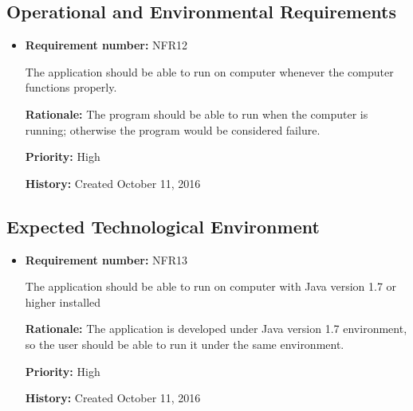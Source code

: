 \documentclass[12pt,letterpaper]{article}
\begin{document}
\subsection{Operational and Environmental Requirements}

\begin{reqbox}
	\begin{itemize}
\subsubsection{Expected Physical Environment}
	\item \textbf{Requirement number: }NFR12

	The application should be able to run on computer whenever the computer functions properly.

	\textbf{Rationale: }The program should be able to run when the computer is running; otherwise the program would be considered failure.

	\textbf{Priority: }High
	
	\textbf{History: }Created October 11, 2016
	\end{itemize}
\end{reqbox}

\subsection{Expected Technological Environment}

\begin{reqbox}
	\begin{itemize}
	\item \textbf{Requirement number: }NFR13

	The application should be able to run on computer with Java version 1.7 or higher installed

	\textbf{Rationale: }The application is developed under Java version 1.7 environment, so the user should be able to run it under the same environment. 

	\textbf{Priority: }High

	\textbf{History: }Created October 11, 2016

	\end{itemize}
\end{reqbox}
\end{document}

